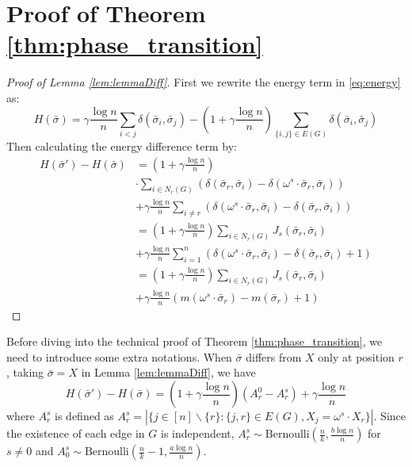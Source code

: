 \documentclass[journal]{IEEEtran}
\newcommand{\A}{\frac{a \log n}{n}}
\newcommand{\B}{\frac{b \log n}{n}}
\newcommand{\1}{\mathbbm{1}}
\begin{document}
\section*{Proof of Theorem \ref{thm:phase_transition}}
\begin{proof}[Proof of Lemma \ref{lem:lemmaDiff}]
	First we rewrite the energy term in \eqref{eq:energy} as:
	\begin{equation*}
	H(\bar{\sigma}) = \gamma \frac{\log n}{n} \sum_{i < j} \delta(\bar{\sigma}_i, \bar{\sigma}_j)
	- (1 + \gamma\frac{\log n}{n}) \sum_{ \{i, j\} \in E(G)} \delta(\bar{\sigma}_i, \bar{\sigma}_j)
	\end{equation*}
	Then calculating the energy difference term by:
	\begin{align*}
	H(\bar{\sigma}') - H(\bar{\sigma}) &= (1 + \gamma\frac{\log n}{n}) \\
	&\cdot \sum_{i \in N_r(G)} (\delta(\bar{\sigma}_r, \bar{\sigma}_i) -
	\delta(\omega^s \cdot \bar{\sigma}_r, \bar{\sigma}_i)) \\
	&+ \gamma \frac{\log n}{n}\sum_{i\neq r}
	( \delta(\omega^s \cdot \bar{\sigma}_r, \bar{\sigma}_i) -
	\delta( \bar{\sigma}_r, \bar{\sigma}_i) ) \\
	& = (1 + \gamma\frac{\log n}{n})\sum_{i \in N_r(G)} J_s(\bar{\sigma}_r, \bar{\sigma}_i) \\
	&+ \gamma \frac{\log n}{n}\sum_{i=1}^n
	( \delta(\omega^s \cdot \bar{\sigma}_r, \bar{\sigma}_i) -
	\delta( \bar{\sigma}_r, \bar{\sigma}_i) +1) \\
	&= (1+\gamma \frac{\log n}{n})\sum_{i \in N_r(G)} J_s(\bar{\sigma}_r, \bar{\sigma}_i)\\
	&+ \gamma \frac{\log n}{n} (m(\omega^s \cdot \bar{\sigma}_r)-m(\bar{\sigma}_r)+1)
	\end{align*}
\end{proof}
Before diving into the technical proof of Theorem \ref{thm:phase_transition}, we need to introduce some extra
notations. When $\bar{\sigma}$ differs from $X$ only at position $r$, taking $\bar{\sigma}=X$ in Lemma \ref{lem:lemmaDiff}, we have
\begin{equation}\label{eq:energy_diff}
H(\bar{\sigma}') - H(\bar{\sigma}) = (1+\gamma \frac{\log n}{n})(A^0_r - A^s_r) + \gamma\frac{\log n}{n}
\end{equation}
where $A^s_r$ is defined as $A^s_r = |\{j \in [n]\backslash \{r\}: \{j, r\} \in E(G), X_j = \omega^s \cdot X_r \}|$.
Since the existence of each edge in $G$ is independent, $A^s_r \sim \textrm{Bernoulli}(\frac{n}{k}, \B ) $ for $s\neq 0$
and $A^s_0 \sim \textrm{Bernoulli}(\frac{n}{k}-1, \A )$.
\end{document}
